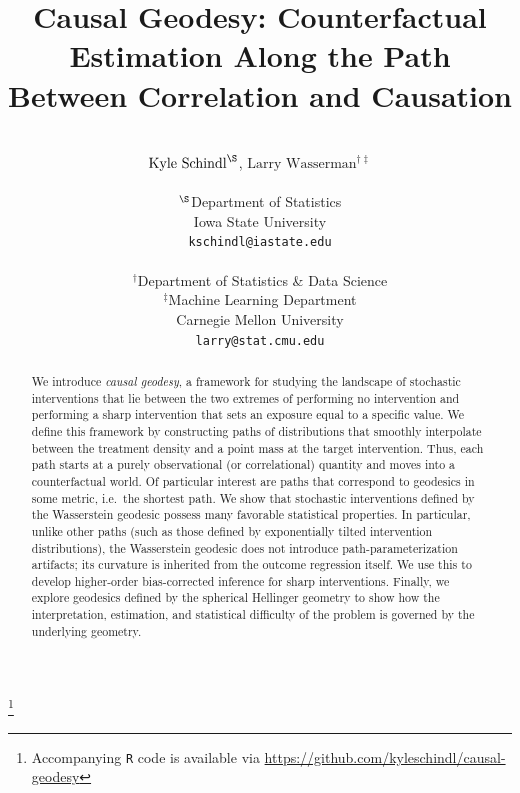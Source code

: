 \documentclass[11pt,twoside]{article}
\theoremstyle{definition}
\theoremstyle{remark}
\newcommand\blfootnote[1]{%
  \begingroup
  \renewcommand\thefootnote{}%
  \footnote{#1}%
  \addtocounter{footnote}{-1}%
  \endgroup
}
\begin{document}
\def\spacingset#1{\renewcommand{\baselinestretch}%
{#1}\small\normalsize} \spacingset{1}

\raggedbottom
\allowdisplaybreaks[1]


  
  \title{\vspace*{-.4in} {Causal Geodesy: Counterfactual Estimation Along the Path Between Correlation and Causation}}
  \author{\\ $\text{Kyle Schindl}^{\S}$, $\text{Larry Wasserman}^{\dagger \ddag}$ \\ \\
    $^{\S}$Department of Statistics \\
    Iowa State University \\
    \texttt{kschindl@iastate.edu} \\ \\ 
    $^\dagger$Department of Statistics \& Data Science \\
    $^\ddag$Machine Learning Department \\
    Carnegie Mellon University \\
    \texttt{larry@stat.cmu.edu}
\date{}
    }

  \maketitle
  \blfootnote{Accompanying \texttt{R} code is available via \href{https://github.com/kyleschindl/causal-geodesy}{https://github.com/kyleschindl/causal-geodesy}}
  \thispagestyle{empty}


\begin{abstract}
{ We introduce \textit{causal geodesy}, a framework for studying the landscape of stochastic interventions that lie between the two extremes of performing no intervention and performing a sharp intervention that sets an exposure equal to a specific value. We define this framework by constructing paths of distributions that smoothly interpolate between the treatment density and a point mass at the target intervention. Thus, each path starts at a purely observational (or correlational) quantity and moves into a counterfactual world. Of particular interest are paths that correspond to geodesics in some metric, i.e.\ the shortest path. We show that stochastic interventions defined by the Wasserstein geodesic possess many favorable statistical properties. In particular, unlike other paths (such as those defined by exponentially tilted intervention distributions), the Wasserstein geodesic does not introduce path-parameterization artifacts; its curvature is inherited from the outcome regression itself. We use this to develop higher-order bias-corrected inference for sharp interventions. Finally, we explore geodesics defined by the spherical Hellinger geometry to show how the interpretation, estimation, and statistical difficulty of the problem is governed by the underlying geometry.}
\end{abstract}
\end{document}
